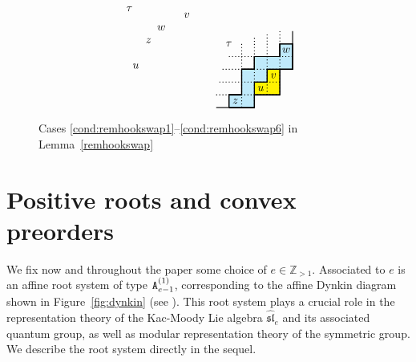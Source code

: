 \documentclass[Unicode,ALCO]{cedram}
\newcommand{\0}{{\bar 0}}
\newcommand{\ZZ}{{\mathbb Z}}
\newcommand{\hackcenter}[1]{
 \xy (0,0)*{#1}; \endxy}
\begin{document}
\begin{figure}
\begin{align*}
{\begin{tikzpicture}[scale=0.4]
\node at (2,5){ $\tau$};
\node at (2.5,0.5){ $u$};
\node at (4.5,3.5){ $w$};
\node at (3.5,2.5){ $z$};
\node at (6.5,4.5){ $v$};
\end{tikzpicture}
}
\qquad
\hackcenter{
\begin{tikzpicture}[scale=0.4]
\draw[thick]   (1,0)--(2,0);
\draw[thick]   (7,5)--(7,6);
\draw[thick, fill=yellow]   (2,0)--(4,0)--(4,1)--(6,1)--(6,3)--(7,3)--(7,5)--(6,5)--(6,4)--(4,4)--(4,3)--(3,3)--(3,1)--(2,1)--(2,0);
\draw[thick, fill=cyan!25] (2,0)--(4,0)--(4,2)--(5,2)--(5,3)--(7,3)--(7,5)--(6,5)--(6,4)--(4,4)--(4,3)--(3,3)--(3,1)--(2,1)--(2,0);
\draw[thick, dotted] (3,0)--(3,5);
\draw[thick, dotted] (4,0)--(4,5.5); 
\draw[thick, dotted] (5,1)--(5,5.75);
\draw[thick, dotted] (6,1)--(6,6);
\draw[thick, dotted] (1,1)--(6,1);
\draw[thick, dotted] (1.25,2)--(6,2);
\draw[thick, dotted] (1.5,3)--(6,3);
\draw[thick, dotted] (2,4)--(7,4);
\draw[thick]   (2,0)--(4,0)--(4,1)--(6,1)--(6,3)--(7,3)--(7,5)--(6,5)--(6,4)--(4,4)--(4,3)--(3,3)--(3,1)--(2,1)--(2,0);
\draw[thick] (2,0)--(4,0)--(4,2)--(5,2)--(5,3)--(7,3)--(7,5)--(6,5)--(6,4)--(4,4)--(4,3)--(3,3)--(3,1)--(2,1)--(2,0);
\node at (2,5){ $\tau$};
\node at (2.5,0.5){ $z$};
\node at (5.5,2.5){ $v$};
\node at (4.5,1.5){ $u$};
\node at (6.5,4.5){ $w$};
\end{tikzpicture}
}
\end{align*}
\caption{Cases \eqref{cond:remhookswap1}--\eqref{cond:remhookswap6} in Lemma~\ref{remhookswap}}
\label{fig:overlaps}     
\end{figure}


\section{Positive roots and convex preorders}\label{posrootsec}
We fix now and throughout the paper some choice of \(e \in \ZZ_{>1}\). Associated to \(e\) is an affine root system of type \({\tt A}_{e-1}^{(1)}\), corresponding to the affine Dynkin diagram shown in Figure~\ref{fig:dynkin}
(see \cite[\S 4, Table Aff 1]{KacBookInfLie}). This root system plays a crucial role in the representation theory of the Kac-Moody Lie algebra \(\widehat{\mathfrak{sl}}_e\) and its associated quantum group, as well as modular representation theory of the symmetric group.
We describe the root system directly in the sequel.
\end{document}
